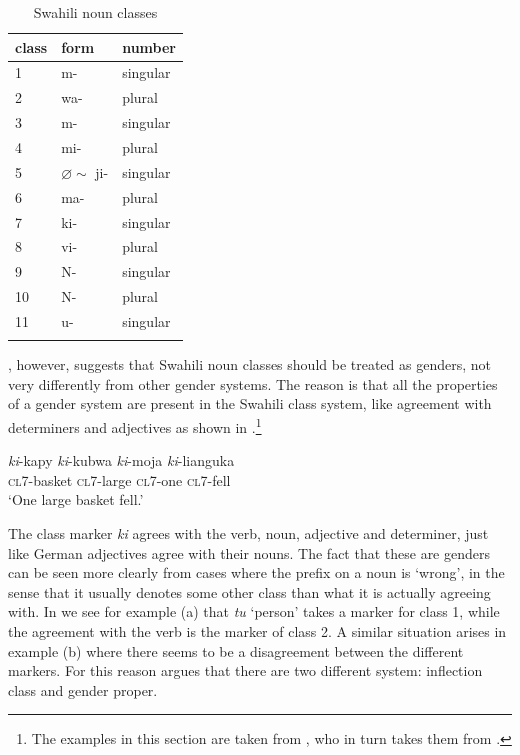 \begin{table}
  \centering
  \begin{tabular}{lll}
    \lsptoprule
    class & form                   & number   \\
    \midrule
    1     & m-                     & singular \\
    2     & wa-                    & plural   \\
    3     & m-                     & singular \\
    4     & mi-                    & plural   \\
    5     & $\varnothing \sim$ ji- & singular \\
    6     & ma-                    & plural   \\
    7     & ki-                    & singular \\
    8     & vi-                    & plural   \\
    9     & N-                     & singular \\
    10    & N-                     & plural   \\
    11    & u-                     & singular \\
    \lspbottomrule
  \end{tabular}\caption{Swahili noun classes}\label{tab:swahili-classes}
\end{table}

\textcite{Corbett.1991}, however, suggests that Swahili  noun classes should be treated as genders, not very differently from other gender systems. The reason is that all the properties of a gender system are present in the Swahili class system, like agreement with determiners and adjectives as shown in .\footnote{The examples in this section are taken from \textcite{Corbett.1991}, who in turn takes them from \textcite[159-183]{Welmers.1973}.}

\begin{exe}
    \ex \label{swahili-class-exe}
    \gll \textit{ki}-kapy \textit{ki}-kubwa \textit{ki}-moja \textit{ki}-lianguka\\
    \textsc{cl7}-basket \textsc{cl7}-large \textsc{cl7}-one \textsc{cl7}-fell\\
    \glt `One large basket fell.'
\end{exe}

The class marker \textit{ki} agrees with the verb, noun, adjective and determiner, just like German adjectives agree with their nouns. The fact that these are genders can be seen more clearly from cases where the prefix on a noun is `wrong', in the sense that it usually denotes some other class than what it is actually agreeing with. In  \autocite[45]{Corbett.1991} we see for example (a) that \textit{tu} `person' takes a marker for class 1, while the agreement with the verb is the marker of class 2. A similar situation arises in example (b) where there seems to be a disagreement between the different markers. For this reason \textcite{Corbett.1991} argues that there are two different system: inflection class and gender proper.

